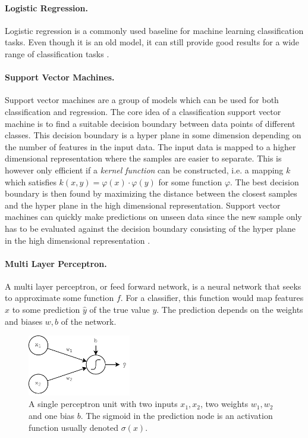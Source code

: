 \paragraph{Logistic Regression.}

Logistic regression is a commonly used baseline for machine learning classification tasks. Even though it is an old model, it can still provide good results for a wide range of classification tasks \citep{chollet2017deep}. 

\paragraph{Support Vector Machines.}

Support vector machines are a group of models which can be used for both classification and regression. The core idea of a classification support vector machine is to find a suitable decision boundary between data points of different classes. This decision boundary is a hyper plane in some dimension depending on the number of features in the input data. The input data is mapped to a higher dimensional representation where the samples are easier to separate. This is however only efficient if a \emph{kernel function} can be constructed, i.e. a mapping $k$ which satisfies $k(x,y) = \varphi(x) \cdot \varphi(y)$ for some function $\varphi$. The best decision boundary is then found by maximizing the distance between the closest samples and the hyper plane in the high dimensional representation. Support vector machines can quickly make predictions on unseen data since the new sample only has to be evaluated against the decision boundary consisting of the hyper plane in the high dimensional representation \citep{chollet2017deep}.   

\paragraph{Multi Layer Perceptron.}
A multi layer perceptron, or feed forward network, is a neural network that seeks to approximate some function $f$. For a classifier, this function would map features $x$ to some prediction $\hat{y}$ of the true value $y$. The prediction depends on the weights and biases $w,b$ of the network.  

\begin{figure}[t]
    \centering
    \includegraphics[width=0.4\textwidth]{Figures/figs-perceptron.pdf}
    \caption{A single perceptron unit with two inputs $x_1, x_2$, two weights $w_1, w_2$ and one bias $b$. The sigmoid in the prediction node is an activation function usually denoted $\sigma(x)$.}
    \label{fig:perceptron}
\end{figure}

